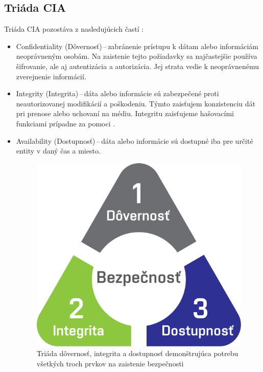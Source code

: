 \subsection{Triáda CIA}
Triáda CIA pozostáva z nasledujúcich častí \cite{McMillan2018}: 
\begin{itemize}
	\item Confidentiality (Dôvernosť)\,--\,zabránenie prístupu k dátam alebo informáciám neoprávneným osobám. Na zaistenie tejto požiadavky sa najčastejšie používa šifrovanie, ale aj autentizácia a autorizácia. Jej strata vedie k neoprávnenému zverejnenie informácií. 
	
	\item Integrity (Integrita)\,--\,dáta alebo informácie sú zabezpečené proti neautorizovanej modifikácií a poškodeniu. Týmto zaisťujem konzistenciu dát pri prenose alebo uchovaní na médiu. Integritu zaisťujeme hašovacími funkciami prípadne za pomoci . 
	
	\item Availability (Dostupnosť)\,--\,dáta alebo informácie sú dostupné iba pre určité entity v daný čas a miesto. 

	\begin{figure}[!h]
		\begin{center}
			\includegraphics[scale=0.6]{obrazky/cia.pdf}
		\end{center}
		\caption[Triáda dôvernosť, integrita a dostupnosť]{Triáda dôvernosť, integrita a dostupnosť demonštrujúca potrebu všetkých troch prvkov na zaistenie bezpečnosti \cite{Vyncke2008}}%
\label{cia}
\end{figure}
\end{itemize}

